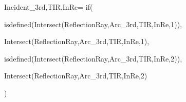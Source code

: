Incident_{3rd,TIR,InRe}=
  if(

    isdefined(Intersect(ReflectionRay,Arc_{3rd,TIR,InRe},1)),

    Intersect(ReflectionRay,Arc_{3rd,TIR,InRe},1),

    isdefined(Intersect(ReflectionRay,Arc_{3rd,TIR,InRe},2)),

    Intersect(ReflectionRay,Arc_{3rd,TIR,InRe},2)

  )

